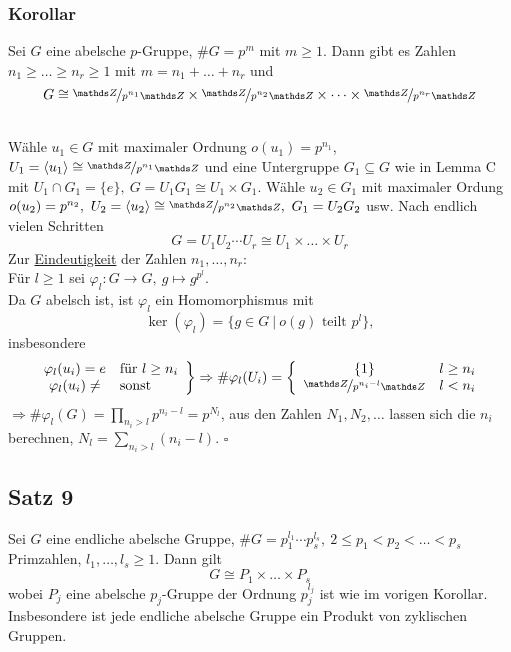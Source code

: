 \subsubsection*{Korollar}
Sei $G$ eine abelsche $p$-Gruppe, $\#G=p^m$ mit $m\ge 1$. 
Dann gibt es Zahlen $n_1\ge \dots \ge n_r\ge 1$ mit $m=n_1+\dots+n_r$ und 
\[ 
G\cong \nicefrac{\Z}{p^{n_1}\Z} \times \nicefrac{\Z}{p^{n_2}\Z} \times \dots \times \nicefrac{\Z}{p^{n_r}\Z} 
\]

\\
Wähle $u_1\in G$ mit maximaler Ordnung $o(u_1)=p^{n_1}$, $U_1=\lh{u_1}\cong \nicefrac{\Z}{p^{n_1}\Z}$ und eine Untergruppe $G_1\subseteq G$ wie in Lemma C mit $U_1\cap G_1=\{e\},~G=U_1G_1\cong U_1\times G_1$. 
Wähle $u_2\in G_1$ mit maximaler Ordung $o(u_2)=p^{n_2}, ~U_2=\lh{u_2}\cong \nicefrac{\Z}{p^{n_2}\Z},~ G_1=U_2G_2$ usw. 
Nach endlich vielen Schritten 
\[
G=U_1U_2\cdots U_r\cong U_1\times \dots \times U_r 
\]
Zur \uline{Eindeutigkeit} der Zahlen $n_1,\dots,n_r$:\\
Für $l\ge 1$ sei $\varphi_l:G\to G,~g\mapsto g^{p^l}$.\\
Da $G$ abelsch ist, ist $\varphi_l$ ein Homomorphismus mit 
\[
\ker(\varphi_l)=\{g\in G~|~o(g)\text{ teilt }p^l\}, 
\]
insbesondere
\[
\left.\begin{array}{cl} \varphi_l(u_i)=e & \text{für } l\ge n_i\\ \varphi_l(u_i)\not= & \text{sonst}    \end{array}\right\}\Rightarrow \#\varphi_l(U_i)=\left\{\begin{array}{cl} \{1\} & l\ge n_i\\ \nicefrac{\Z}{p^{n_i-l}\Z} & l<n_i    \end{array}\right. 
\]
$\Rightarrow \#\varphi_l(G)=\prod_{n_i>l}p^{n_i-l}=p^{N_l}$, aus den Zahlen $N_1,N_2,\dots$ lassen sich die $n_i$ berechnen, $N_l=\sum_{n_i>l}(n_i-l)$.
\hfill $\square$

\subsection{Satz 9}
\label{sub:satz_9}
Sei $G$ eine endliche abelsche Gruppe, $\#G=p_1^{l_1}\cdots p_s^{l_s},~ 2\le p_1<p_2<\dots<p_s$ Primzahlen, $l_1,\dots,l_s\ge 1$. 
Dann gilt 
\[
G\cong P_1\times \dots\times P_s 
\]
wobei $P_j$ eine abelsche $p_j$-Gruppe der Ordnung $p_j^{l_j}$ ist wie im vorigen Korollar.\\
Insbesondere ist jede endliche abelsche Gruppe ein Produkt von zyklischen Gruppen.\\


